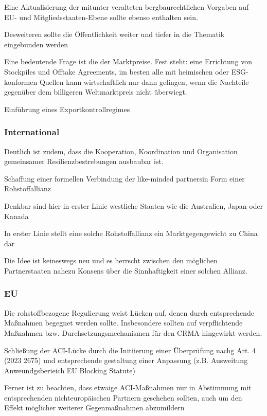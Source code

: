 \documentclass[12pt,a4paper,oneside]{book} %
\begin{document}
Eine Aktualisierung der mitunter veralteten bergbaurechtlichen Vorgaben auf EU- und Mitgliedsstaaten-Ebene sollte ebenso enthalten sein.

Desweiteren sollte die Öffentlichkeit weiter und tiefer in die Thematik eingebunden werden

Eine bedeutende Frage ist die der Marktpreise. Fest steht: eine Errichtung von Stockpiles und Offtake Agreements, im besten alle mit heimischen oder ESG-konformen Quellen kann wirtschaftlich nur dann gelingen, wenn die Nachteile gegenüber dem billigeren Weltmarktpreis nicht überwiegt.

Einführung eines Exportkontrollregimes


\subsubsection{International}

Deutlich ist zudem, dass die Kooperation, Koordination und Organisation gemeinsamer Resilienzbestrebungen ausbaubar ist.

Schaffung einer formellen Verbindung der \glqq like-minded partners\grqq in Form einer Rohstoffallianz

Denkbar sind hier in erster Linie westliche Staaten wie die Australien, Japan oder Kanada

In erster Linie stellt eine solche Rohstoffallianz ein Marktgegengewicht zu China dar

Die Idee ist keineswegs neu und es herrscht zwischen den möglichen Partnerstaaten nahezu Konsens über die Sinnhaftigkeit einer solchen Allianz.

\subsubsection{EU}
Die rohstoffbezogene Regulierung weist Lücken auf, denen durch entsprechende Maßnahmen begegnet werden sollte. Insbesondere sollten auf verpflichtende Maßnahmen bzw. Durchsetzungsmechanismen für den CRMA hingewirkt werden.


Schließung der ACI-Lücke durch die Initiierung einer Überprüfung nachg Art. 4 (2023 2675) und entsprechende gestaltung einer Anpassung (z.B. Ausweitung Anweundgsberieich EU Blocking Statute)

Ferner ist zu beachten, dass etwaige ACI-Maßnahmen nur in Abstimmung mit entsprechenden nichteuropäischen Partnern geschehen sollten, auch um den Effekt möglicher weiterer Gegenmaßnahmen abzumildern
\end{document}
